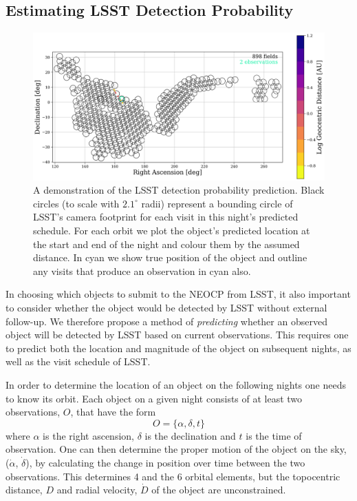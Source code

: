\documentclass[twocolumn]{aastex631}
\begin{document}
\subsection{Estimating LSST Detection Probability}\label{sec:pred_alg}
\begin{figure}[htb]
    \centering
    \includegraphics[width=\textwidth]{methods_placeholder.png}
    \caption{A demonstration of the LSST detection probability prediction. Black circles (to scale with $2.1^{\circ}$ radii) represent a bounding circle of LSST's camera footprint for each visit in this night's predicted schedule. For each orbit we plot the object's predicted location at the start and end of the night and colour them by the assumed distance. In cyan we show true position of the object and outline any visits that produce an observation in cyan also.}
    \label{fig:circles}
\end{figure}

In choosing which objects to submit to the NEOCP from LSST, it also important to consider whether the object would be detected by LSST without external follow-up. We therefore propose a method of \textit{predicting} whether an observed object will be detected by LSST based on current observations. This requires one to predict both the location and magnitude of the object on subsequent nights, as well as the visit schedule of LSST.

In order to determine the location of an object on the following nights one needs to know its orbit. Each object on a given night consists of at least two observations, $O$, that have the form
\begin{equation}
    O = \{ \alpha, \delta, t \}
\end{equation}
where $\alpha$ is the right ascension, $\delta$ is the declination and $t$ is the time of observation. One can then determine the proper motion of the object on the sky, ($\dot{\alpha}$, $\dot{\delta}$), by calculating the change in position over time between the two observations. This determines 4 and the 6 orbital elements, but the topocentric distance, $D$ and radial velocity, $\dot{D}$ of the object are unconstrained.
\end{document}
